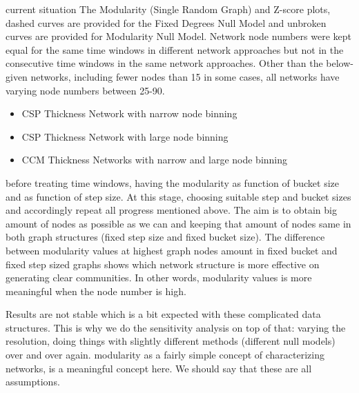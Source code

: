 {%
	
	
	current situation
	The Modularity (Single Random Graph) and Z-score plots, dashed curves are provided for the Fixed Degrees Null Model and unbroken curves are provided for Modularity Null Model.
	Network node numbers were kept equal for the same time windows in different network approaches but not in the consecutive time windows in the same network approaches.
	Other than the below-given networks, including fewer nodes than 15 in some cases, all networks have varying node numbers between 25-90.
	\begin{itemize}
		\item CSP Thickness Network with narrow node binning
		\item CSP Thickness Network with large node binning
		\item CCM Thickness Networks with narrow and large node binning
	\end{itemize}

before treating time windows, having the modularity as function of bucket size and as function of step size. At this stage, choosing suitable step and bucket sizes and accordingly repeat all progress mentioned above. The aim is to obtain big amount of nodes as possible as we can and keeping that amount of nodes same in both graph structures (fixed step size and fixed bucket size). The difference between modularity values at highest graph nodes amount in fixed bucket and fixed step sized graphs shows which network structure is more effective on generating clear communities. In other words, modularity values is more meaningful when the node number is high.

Results are not stable which is a bit expected with these complicated data structures. This is why we do the sensitivity analysis on top of that: varying the resolution, doing things with slightly different methods (different null models) over and over again. 
modularity as a fairly simple concept of characterizing networks, is a meaningful concept here. We should say that these are all assumptions.}

